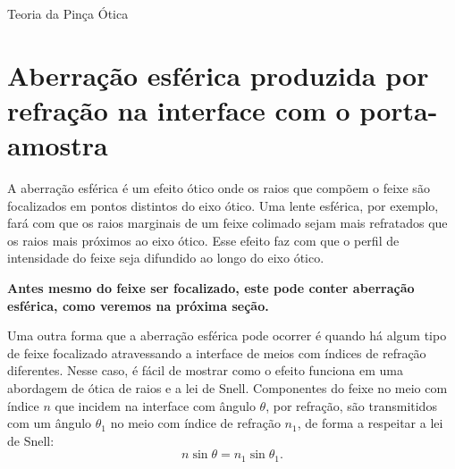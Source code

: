 \begin{chapter}{Teoria da Pinça Ótica}
%
%
%
%
\section{Aberração esférica produzida por refração na interface com o porta-amostra}
\label{Aberracao esferica}

\hspace{5 mm}A aberração esférica é um efeito ótico onde os raios que compõem o feixe são focalizados em pontos distintos do eixo ótico. Uma lente esférica, por exemplo, fará com que os raios marginais de um feixe colimado sejam mais refratados que os raios mais próximos ao eixo ótico. Esse efeito faz com que o perfil de intensidade do feixe seja difundido ao longo do eixo ótico.

{\bf Antes mesmo do feixe ser focalizado, este pode conter aberração esférica, como veremos na próxima seção.}

Uma outra forma que a aberração esférica pode ocorrer é quando há algum tipo de feixe focalizado atravessando a interface de meios com índices de refração diferentes. Nesse caso, é fácil de mostrar como o efeito funciona em uma abordagem de ótica de raios e a lei de Snell. Componentes do feixe no meio com índice $n$ que incidem na interface com ângulo $\theta$, por refração, são transmitidos com um ângulo $\theta_1$ no meio com índice de refração $n_1$, de forma a respeitar a lei de Snell:
%
\begin{equation}
n\sin\theta=n_1\sin\theta_1.
\label{snell}
\end{equation}
%


\end{chapter}
